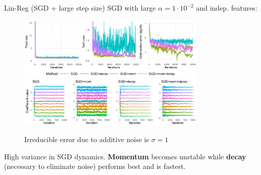\documentclass[11pt,compress,t,notes=noshow, xcolor=table]{beamer}
\begin{document}
\begin{vbframe}{Lin-Reg (SGD + large step size)}
\vspace{-0.4cm}
SGD with large $\alpha=1 \cdot 10^{-2}$ and indep. features:
\begin{figure}
            \includegraphics[width=0.8\textwidth]{slides/04-multivariate-first-order/figure_man/simu_linmod/SGD_reg_large_lr_iters.pdf} \\
             \includegraphics[width=0.8\textwidth]{slides/04-multivariate-first-order/figure_man/simu_linmod/SGD_reg_coef_large.pdf}\\
            \begin{footnotesize}
                Irreducible error due to additive noise is $\sigma=1$
            \end{footnotesize}
\end{figure}
High variance in SGD dynamics. \textbf{Momentum} becomes unstable while \textbf{decay} (necessary to eliminate noise) performs best and is fastest.
\end{vbframe}
\end{document}
